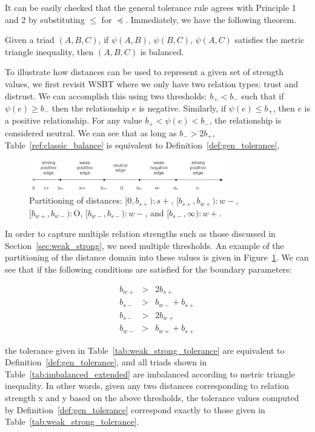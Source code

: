 \documentclass[acmtweb]{acmsmall}
\begin{document}
It can be easily checked that the general tolerance rule agrees with
Principle 1 and 2 by substituting $\leq$ for $\preceq$.  Immediately, we have the following
theorem.
\begin{theorem} 
Given a triad $(A,B,C)$, if $\psi(A,B)$, $\psi(B,C)$, $\psi(A,C)$
satisfies the metric triangle inequality, then $(A,B,C)$ is balanced.
\end{theorem}

To illustrate how distances can be used to represent a given set of
strength values, we first revisit WSBT where we only have two relation
types: trust and distrust. We can accomplish this using two
thresholds: $b_{+} < b_{-}$ such that if $\psi(e)\geq b_{-}$ then the
relationship $e$ is negative. Similarly, if $\psi(e)\leq b_{+}$, then
$e$ is a positive relationship. For any value $b_{+} < \psi(e) <
b_{-}$, the relationship is considered neutral. We can see that as
long as $b_{-}>2b_{+}$, Table~\ref{ref:classic_balance} is equivalent
to Definition~\ref{def:gen_tolerance}.

\begin{figure}[th]
\centering
\includegraphics[height=0.55in]{mapping2.pdf}
\vspace*{-0.1in}
\caption{\label{fig:partition}Partitioning of distances:
  $[0,b_{s+}):s+$, $[b_{s+}, b_{w+}): w-$, $[b_{w+}, b_{w-}):\mbox{O}$,
$[b_{w-}, b_{s-}):w-$, and $ [b_{s-}, \infty):w+$.}

\end{figure}

In order to capture multiple relation strengths such as those
discussed in Section~\ref{sec:weak_strong}, we need multiple
thresholds. An example of the partitioning of the distance domain into
these values is given in Figure~\ref{fig:partition}. We can see that
if the following conditions are satisfied for the boundary parameters:


\begin{eqnarray*}
b_{w+}  & > & 2b_{s+} \\
b_{s-}  & > & b_{w-} + b_{s+}  \\
b_{s-}  & > & 2b_{w+} \\
b_{w-}  & > & b_{w+}+b_{s+}
\end{eqnarray*} 

\noindent the tolerance given in Table~\ref{tab:weak_strong_tolerance}
are equivalent to Definition~\ref{def:gen_tolerance}, and all triads
shown in Table~\ref{tab:imbalanced_extended} are imbalanced according
to metric triangle inequality. In other words, given any
  two distances corresponding to relation strength x and y based on
  the above thresholds, the tolerance values computed by
  Definition~\ref{def:gen_tolerance} correspond exactly to those given
  in Table~\ref{tab:weak_strong_tolerance}.
\end{document}

